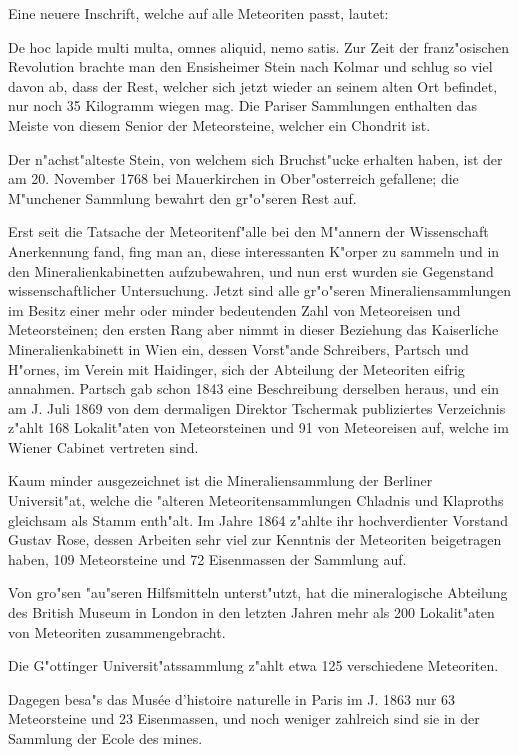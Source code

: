 \documentclass[a4paper, 11pt, oneside]{article}
\begin{document}
Eine neuere Inschrift, welche auf alle Meteoriten passt, lautet:

De hoc lapide multi multa, omnes aliquid, nemo satis. Zur Zeit der franz"osischen Revolution brachte man den Ensisheimer Stein nach Kolmar und schlug so viel davon ab, dass der Rest, welcher sich jetzt wieder an seinem alten Ort befindet, nur noch 35 Kilogramm wiegen mag. Die Pariser Sammlungen enthalten das Meiste von diesem Senior der Meteorsteine, welcher ein Chondrit ist.

Der n"achst"alteste Stein, von welchem sich Bruchst"ucke erhalten haben, ist der am 20. November 1768 bei Mauerkirchen in Ober"osterreich gefallene; die M"unchener Sammlung bewahrt den gr"o"seren Rest auf.

Erst seit die Tatsache der Meteoritenf"alle bei den M"annern der Wissenschaft Anerkennung fand, fing man an, diese interessanten K"orper zu sammeln und in den Mineralienkabinetten aufzubewahren, und nun erst wurden sie Gegenstand wissenschaftlicher Untersuchung. Jetzt sind alle gr"o"seren Mineraliensammlungen im Besitz einer mehr oder minder bedeutenden Zahl von Meteoreisen und Meteorsteinen; den ersten Rang aber nimmt in dieser Beziehung das Kaiserliche Mineralienkabinett in Wien ein, dessen Vorst"ande Schreibers, Partsch und H"ornes, im Verein mit Haidinger, sich der Abteilung der Meteoriten eifrig annahmen. Partsch gab schon 1843 eine Beschreibung derselben heraus, und ein am J. Juli 1869 von dem dermaligen Direktor Tschermak publiziertes Verzeichnis z"ahlt 168 Lokalit"aten von Meteorsteinen und 91 von Meteoreisen auf, welche im Wiener Cabinet vertreten sind.

Kaum minder ausgezeichnet ist die Mineraliensammlung der Berliner Universit"at, welche die "alteren Meteoritensammlungen Chladnis und Klaproths gleichsam als Stamm enth"alt. Im Jahre 1864 z"ahlte ihr hochverdienter Vorstand Gustav Rose, dessen Arbeiten sehr viel zur Kenntnis der Meteoriten beigetragen haben, 109 Meteorsteine und 72 Eisenmassen der Sammlung auf.

Von gro"sen "au"seren Hilfsmitteln unterst"utzt, hat die mineralogische Abteilung des British Museum in London in den letzten Jahren mehr als 200 Lokalit"aten von Meteoriten zusammengebracht.

Die G"ottinger Universit"atssammlung z"ahlt etwa 125 verschiedene Meteoriten.

Dagegen besa"s das Musée d'histoire naturelle in Paris im J. 1863 nur 63 Meteorsteine und 23 Eisenmassen, und noch weniger zahlreich sind sie in der Sammlung der Ecole des mines.
\end{document}
